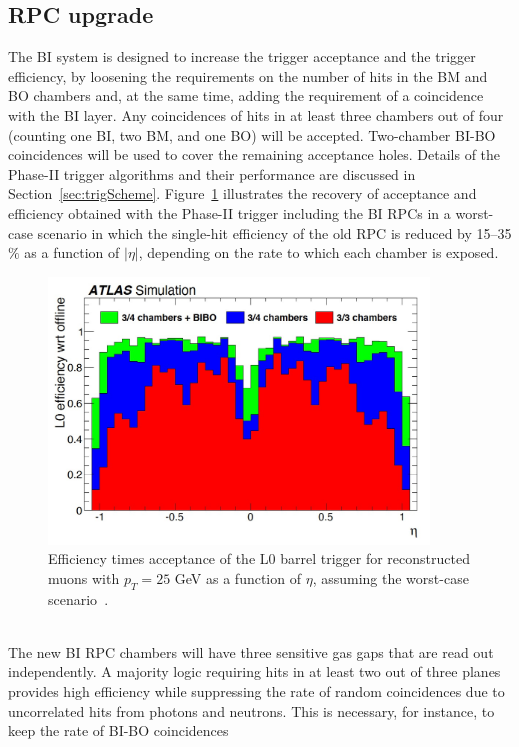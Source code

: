 \subsection{RPC upgrade}
The BI system is designed to increase the trigger acceptance and the trigger efficiency, by
loosening the requirements on the number of hits in the BM and BO chambers and, at the
same time, adding the requirement of a coincidence with the BI layer. Any coincidences of
hits in at least three chambers out of four (counting one BI, two BM, and one BO) will be
accepted. Two-chamber BI-BO coincidences will be used to cover the remaining acceptance
holes. Details of the Phase-II trigger algorithms and their performance are discussed in
Section~\ref{sec:trigScheme}. Figure~\ref{fig:tdr_eff} illustrates the recovery of acceptance and 
efficiency obtained with the Phase-II trigger including the BI RPCs in a worst-case scenario in 
which the single-hit efficiency of the old RPC is reduced by 15–35$\%$ as a function of $|\eta|$, 
depending on the rate to which each chamber is exposed.
\begin{figure}[!h]
	\centering
	\includegraphics[width=0.9\textwidth]{Chapters/CH3/figures/tdr_eff}
	\caption{Efficiency times acceptance of the L0 barrel trigger for reconstructed muons with $p_{T} =
     25$ GeV as a function of $\eta$, assuming the worst-case scenario~\cite{TDR}.}
	\label{fig:tdr_eff}
\end{figure}
\\The new BI RPC chambers will have three sensitive gas gaps that are read out independently.
A majority logic requiring hits in at least two out of three planes provides high efficiency
while suppressing the rate of random coincidences due to uncorrelated hits from
photons and neutrons. This is necessary, for instance, to keep the rate of BI-BO coincidences
